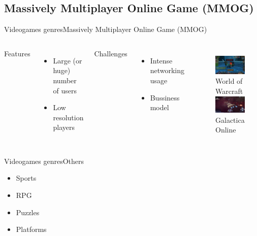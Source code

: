 \documentclass[10pt,compress]{beamer} %
\begin{document}
\subsection{Massively Multiplayer Online Game (MMOG)}
\begin{frame}{Videogames genres}{Massively Multiplayer Online Game (MMOG)}
    \begin{columns}
		Features
			\begin{itemize}
			\item Large (or huge)  number of users
			\item Low resolution players
			\end{itemize}
	 	Challenges
			\begin{itemize}
			\item Intense networking usage
			\item Bussiness model	
			\end{itemize}

   	 	\begin{figure}[t]
		\begin{center}
		    \includegraphics[width=0.9\linewidth]{figs/wow}\\World of Warcraft\\\bigskip
		    \includegraphics[width=0.9\linewidth]{figs/galactica}\\Galactica Online
		\end{center}
   	 	\end{figure}
    \end{columns}
\end{frame}

\begin{frame}{Videogames genres}{Others}
	\begin{itemize}
	\item Sports
	\item RPG
	\item Puzzles
	\item Platforms
	\end{itemize}
\end{frame}
\end{document}
